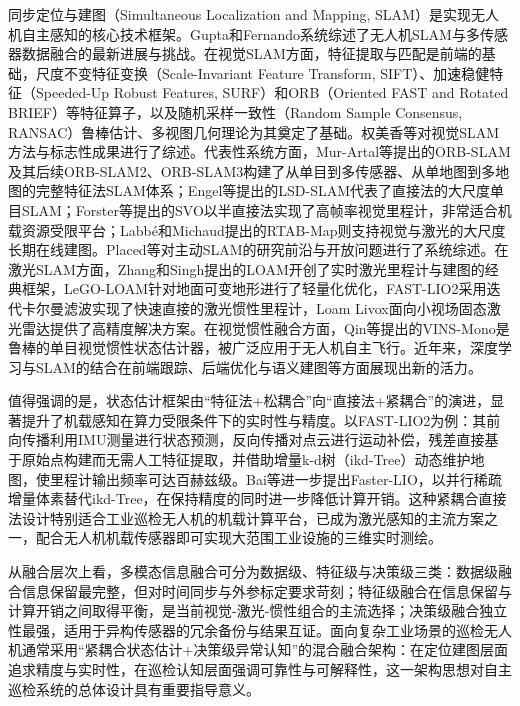 同步定位与建图（Simultaneous Localization and Mapping, SLAM）是实现无人机自主感知的核心技术框架\cite{durrant2006simultaneous,cadena2016past,wujq2021review,gaox2017visual}。Gupta和Fernando\cite{gupta2022slam}系统综述了无人机SLAM与多传感器数据融合的最新进展与挑战。在视觉SLAM方面，特征提取与匹配是前端的基础，尺度不变特征变换（Scale-Invariant Feature Transform, SIFT）\cite{lowe2004distinctive}、加速稳健特征（Speeded-Up Robust Features, SURF）和ORB（Oriented FAST and Rotated BRIEF）\cite{rublee2011orb}等特征算子，以及随机采样一致性（Random Sample Consensus, RANSAC）\cite{fischler1981random}鲁棒估计、多视图几何理论\cite{hartley2003multiple}为其奠定了基础。权美香等\cite{quanmx2016overview}对视觉SLAM方法与标志性成果进行了综述。代表性系统方面，Mur-Artal等提出的ORB-SLAM\cite{mur2015orb}及其后续ORB-SLAM2\cite{mur2017orb}、ORB-SLAM3\cite{campos2021orb}构建了从单目到多传感器、从单地图到多地图的完整特征法SLAM体系；Engel等提出的LSD-SLAM代表了直接法的大尺度单目SLAM；Forster等提出的SVO以半直接法实现了高帧率视觉里程计，非常适合机载资源受限平台；Labbé和Michaud提出的RTAB-Map则支持视觉与激光的大尺度长期在线建图。Placed等\cite{placed2023active}对主动SLAM的研究前沿与开放问题进行了系统综述。在激光SLAM方面，Zhang和Singh提出的LOAM\cite{zhang2014loam}开创了实时激光里程计与建图的经典框架，LeGO-LOAM针对地面可变地形进行了轻量化优化，FAST-LIO2\cite{xu2022fast}采用迭代卡尔曼滤波实现了快速直接的激光惯性里程计，Loam Livox面向小视场固态激光雷达提供了高精度解决方案。在视觉惯性融合方面，Qin等提出的VINS-Mono\cite{qin2018vins}是鲁棒的单目视觉惯性状态估计器，被广泛应用于无人机自主飞行。近年来，深度学习与SLAM的结合在前端跟踪、后端优化与语义建图等方面展现出新的活力\cite{huangzx2023survey}。


值得强调的是，状态估计框架由“特征法+松耦合”向“直接法+紧耦合”的演进，显著提升了机载感知在算力受限条件下的实时性与精度。以FAST-LIO2\cite{xu2022fast}为例：其前向传播利用IMU测量进行状态预测，反向传播对点云进行运动补偿，残差直接基于原始点构建而无需人工特征提取，并借助增量k-d树（ikd-Tree）动态维护地图，使里程计输出频率可达百赫兹级。Bai等\cite{bai2022fasterlio}进一步提出Faster-LIO，以并行稀疏增量体素替代ikd-Tree，在保持精度的同时进一步降低计算开销。这种紧耦合直接法设计特别适合工业巡检无人机的机载计算平台，已成为激光感知的主流方案之一，配合无人机机载传感器即可实现大范围工业设施的三维实时测绘\cite{xu2022fast}。


从融合层次上看，多模态信息融合可分为数据级、特征级与决策级三类\cite{panq2003basic,hey2000multi}：数据级融合信息保留最完整，但对时间同步与外参标定要求苛刻；特征级融合在信息保留与计算开销之间取得平衡，是当前视觉-激光-惯性组合的主流选择；决策级融合独立性最强，适用于异构传感器的冗余备份与结果互证。面向复杂工业场景的巡检无人机通常采用“紧耦合状态估计+决策级异常认知”的混合融合架构：在定位建图层面追求精度与实时性，在巡检认知层面强调可靠性与可解释性，这一架构思想对自主巡检系统的总体设计具有重要指导意义。

